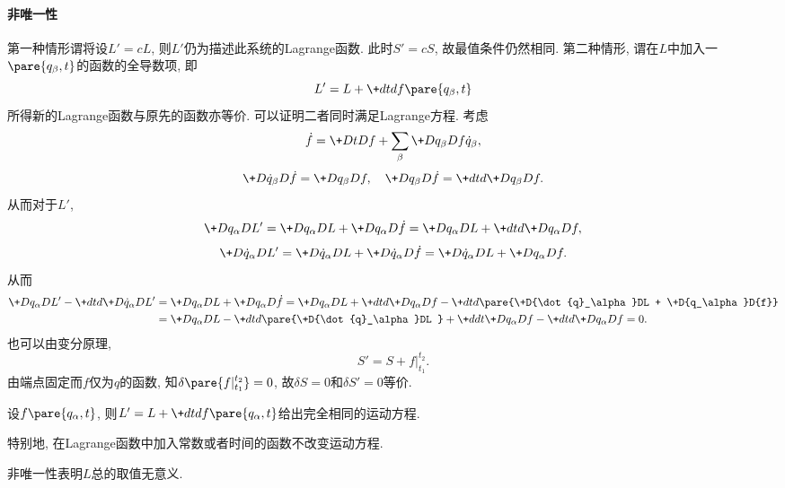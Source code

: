 \documentclass[../LectureNotes.tex]{subfiles}
\begin{document}
\paragraph{非唯一性} %
\label{par:非唯一性}

第一种情形谓将设$L'=cL$, 则$L'$仍为描述此系统的Lagrange函数. 此时$S'=cS$, 故最值条件仍然相同. 第二种情形, 谓在$L$中加入一$\pare{q_\beta,t}$的函数的全导数项, 即
\[ L' = L + \+dtd{}f\pare{q_\beta, t} \]
所得新的Lagrange函数与原先的函数亦等价. 可以证明二者同时满足Lagrange方程. 考虑
\[ \dot{f} = \+DtDf + \sum_\beta \+D{q_\beta}D{f}\dot{q}_\beta, \]
\[ \+D{\dot{q}_\beta}D{\dot{f}} = \+D{q_\beta}D{f},\quad \+D{q_\beta}D{\dot{f}} = \+dtd{}\+D{q_\beta}D{f}. \]
从而对于$L'$,
\[ \+D{q_\alpha}D{L'} = \+D{q_\alpha}DL + \+D{q_\alpha}D{\dot{f}} = \+D{q_\alpha}DL + \+dtd{}\+D{q_\alpha}D{f}, \]
\[ \+D{\dot{q}_\alpha}D{L'} = \+D{\dot{q}_\alpha}DL + \+D{\dot{q}_\alpha}D{\dot{f}} = \+D{\dot{q}_\alpha}DL + \+D{q_\alpha}D{f}. \]
从而
\begin{align*}
    \+D{q_\alpha}D{L'} - \+dtd{}\+D{\dot{q}_\alpha}D{L'} &=  \+D{q_\alpha}DL + \+D{q_\alpha}D{\dot{f}} = \+D{q_\alpha}DL + \+dtd{}\+D{q_\alpha}D{f} - \+dtd{}\pare{\+D{\dot{q}_\alpha}DL + \+D{q_\alpha}D{f}} \\
    &= \+D{q_\alpha}DL - \+dtd{}\pare{\+D{\dot{q}_\alpha}DL } + \+ddt{} \+D{q_\alpha}Df - \+dtd{} \+D{q_\alpha}Df = 0.
\end{align*}
也可以由变分原理,
\[ S' = S + f\vert_{t_1}^{t_2}. \]
由端点固定而$f$仅为$q$的函数, 知$\delta \pare{f\vert_{t_1}^{t_2}} = 0$, 故$\delta S = 0$和$\delta S' = 0$等价.
\begin{figure}[ht]
    \centering
    \centerline{
    }
    \caption{}
\end{figure}
\begin{finale}
    \begin{theorem}[规范不变性]
        \label{thm:规范不变性}
        设$f\pare{q_\alpha, t}$, 则$L' = \displaystyle L + \+dtd{}f\pare{q_\alpha,t}$给出完全相同的运动方程.
    \end{theorem}
\end{finale}
\begin{ex}
    特别地, 在Lagrange函数中加入常数或者时间的函数不改变运动方程.
\end{ex}
\begin{remark}
    非唯一性表明$L$总的取值无意义.
\end{remark}
\end{document}
